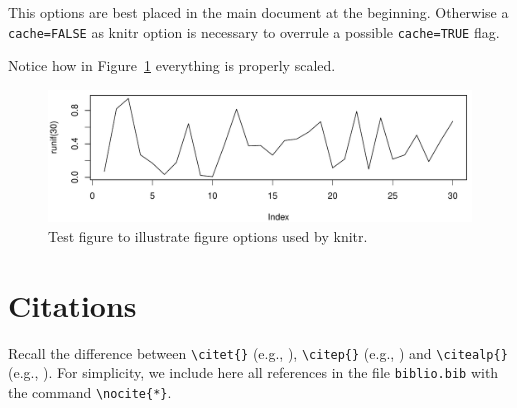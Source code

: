 \bigskip

This options are best placed in the main document at the beginning. Otherwise a \verb+cache=FALSE+ as knitr option is necessary to overrule a possible  \verb+cache=TRUE+ flag.

\bigskip

Notice how in Figure~\ref{f02:1} everything is properly scaled.

\begin{figure}
\begin{knitrout}
\color{fgcolor}

{\centering \includegraphics[width=\textwidth-3cm]{figure/ch02_figunnamed-chunk-3-1} 

}


\end{knitrout}
  \caption{Test figure to illustrate figure options used by knitr.}
  \label{f02:1}
\end{figure}


\section{Citations}

Recall the difference between \verb+\citet{}+ (e.g., \citet{Chu:Geor:99}), \verb+\citep{}+ (e.g., \citep{Chu:Geor:99}) and \verb+\citealp{}+ (e.g., \citealp{Chu:Geor:99}).
For simplicity, we include here all references in the file \verb+biblio.bib+ with the command \verb+\nocite{*}+.\nocite{*}

